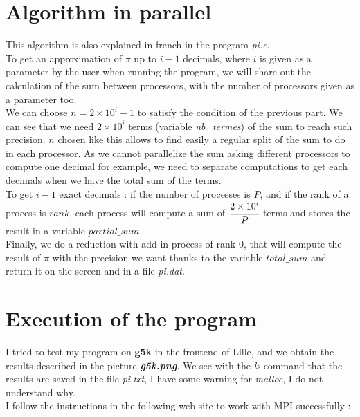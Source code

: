 \documentclass[10pt]{article}
\begin{document}
\newpage

\; \vspace*{2cm}
\section*{Algorithm in parallel}

This algorithm is also explained in french in the program \textit{pi.c}. \\

To get an approximation of $\pi$ up to $i-1$ decimals, where $i$ is given as a parameter by the user when running the program, we will share out the calculation of the sum between processors, with the number of processors given as a parameter too. \\

We can choose $n = 2\times 10^i - 1$ to satisfy the condition of the previous part. We can see that we need $2\times 10^i$ terms (variable \textit{nb\_termes}) of the sum to reach such precision. $n$ chosen like this allows to find easily a regular split of the sum to do in each processor. As we cannot parallelize the sum asking different processors to compute one decimal for example, we need to separate computations to get each decimals when we have the total sum of the terms. \\

To get $i-1$ exact decimals : if the number of processes is $P$, and if the rank of a process is $rank$, each process will compute a sum of $\cfrac{2\times 10^i}{P}$ terms and stores the result in a variable $partial\_sum$. \\

Finally, we do a reduction with add in process of rank $0$, that will compute the result of $\pi$ with the precision we want thanks to the variable $total\_sum$ and return it on the screen and in a file \textit{pi.dat}.


\section*{Execution of the program}

I tried to test my program on \textbf{g5k} in the frontend of Lille, and we obtain the results described in the picture \textit{\textbf{g5k.png}}. We see with the \textit{ls} command that the results are saved in the file \textit{pi.txt}, I have some warning for \textit{malloc}, I do not understand why.\\

I follow the instructions in the following web-site to work with MPI successfully :
\end{document}
